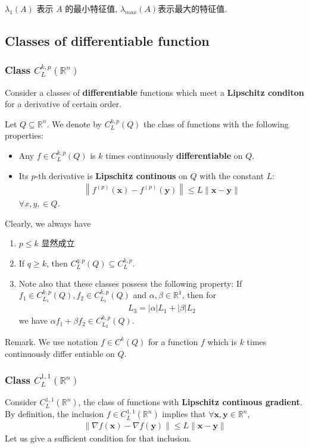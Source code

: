 
$\lambda_1(A)$ 表示 $A$ 的最小特征值, $\lambda_{max}(A)$表示最大的特征值. 


\subsection{Classes of differentiable function}
\subsubsection{Class \texorpdfstring{$C_L^{k,p}(\mathbb{R}^n)$}. }
Consider a classes of \textbf{differentiable} functions which meet a \textbf{Lipschitz conditon} for a derivative of certain order.

Let $Q\subseteq \mathbb{R}^n$. We denote by $C_L^{k,p}(Q)$ the class of functions with the following properties:
\begin{itemize}
    \item Any $f\in C_L^{k,p}(Q)$ is $k$ times continuously \textbf{differentiable} on $Q$.
    \item Its $p$-th derivative is \textbf{Lipschitz continous} on $Q$ with the constant $L$:
    \begin{align*}
        \left\| f^{(p)}(\bm x)-f^{(p)}(\bm y) \right\|\le L\|\bm x-\bm y\|
    \end{align*}
    $\forall x,y,\in Q$. 
\end{itemize}

Clearly, we always have
\begin{enumerate}
    \item $p\le k$ 显然成立
    \item If $q\ge k$, then $C_L^{q,p}(Q)\subseteq C_L^{k,p}$. 
    \item Note also that these classes possess the following property:
    \subitem If $f_1\in C_{L_1}^{k,p}(Q), f_2\in C_{L_1}^{k,p}(Q)$ and $\alpha, \beta\in \mathbb{R}^1$, then for 
    \begin{align*}
        L_3=|\alpha| L_1+|\beta|L_2
    \end{align*}
    we have $\alpha f_1+\beta f_2\in C_{L_3}^{k,p}(Q)$. 
\end{enumerate}
Remark. We use notation $f\in C^k(Q)$ for a function $f$ which is $k$ times continuously differ entiable on $Q$.

\subsubsection{Class \texorpdfstring{$C_L^{1,1}(\mathbb{R}^n)$}. } 
Consider $C_L^{1,1}(\mathbb{R}^n)$, the class of functions with \textbf{Lipschitz continous gradient}. By definition, the inclusion $f\in C_L^{1,1}(\mathbb{R}^n)$ implies that $\forall \bm x,\bm y\in \mathbb{R}^n$, 
\begin{align*}
    \| \nabla f(\bm x)-\nabla f(\bm y) \|\le L\|\bm x-\bm y\| %
\end{align*}
Let us give a sufficient condition for that inclusion. 

